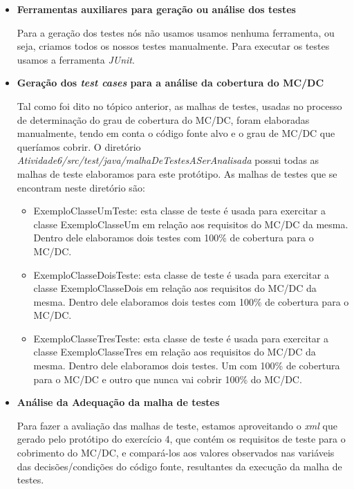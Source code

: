 \documentclass[a4paper,11pt]{article}
\newcommand{\sepitem}{\vspace{0.1in}\item}
\begin{document}
\begin{itemize}

\sepitem \textbf{Ferramentas auxiliares para geração ou análise dos testes}
\setlength{\parindent}{5ex} 

Para a geração dos testes nós não usamos usamos nenhuma ferramenta, ou seja, criamos todos os nossos 
testes manualmente. Para executar os testes usamos a ferramenta \textit{JUnit}.

\sepitem \textbf{Geração dos \textit{test cases} para a análise da cobertura do MC/DC}
\setlength{\parindent}{5ex}

Tal como foi dito no tópico anterior, as malhas de testes, usadas no processo de determinação do grau 
de cobertura do MC/DC, foram elaboradas manualmente, tendo em conta o código fonte alvo e o grau de 
MC/DC que queríamos cobrir. O diretório \textit{Atividade6/src/test/java/malhaDeTestesASerAnalisada} possui 
todas as malhas de teste elaboramos para este protótipo. As malhas de testes que se encontram neste 
diretório são:

\begin{itemize}
\item ExemploClasseUmTeste: esta classe de teste é usada para exercitar a classe ExemploClasseUm 
em relação aos requisitos do MC/DC da mesma. Dentro dele elaboramos dois testes com 100\% de 
cobertura para o MC/DC.
\item ExemploClasseDoisTeste: esta classe de teste é usada para exercitar a classe ExemploClasseDois 
em relação aos requisitos do MC/DC da mesma. Dentro dele elaboramos dois testes com 100\% de 
cobertura para o MC/DC.
\item ExemploClasseTresTeste: esta classe de teste é usada para exercitar a classe ExemploClasseTres 
em relação aos requisitos do MC/DC da mesma. Dentro dele elaboramos dois testes. Um com 100\% de 
cobertura para o MC/DC e outro que nunca vai cobrir 100\% do MC/DC. 
\end{itemize}

\sepitem \textbf{Análise da Adequação da malha de testes}
\setlength{\parindent}{5ex}

Para fazer a avaliação das malhas de teste, estamos aproveitando o \textit{xml} que gerado pelo protótipo do
exercício 4, que contém os requisitos de teste para o cobrimento do MC/DC, e compará-los aos valores 
observados nas variáveis das decisões/condições do código fonte, resultantes da execução da malha de 
testes.
 

\end{itemize}
\end{document}
